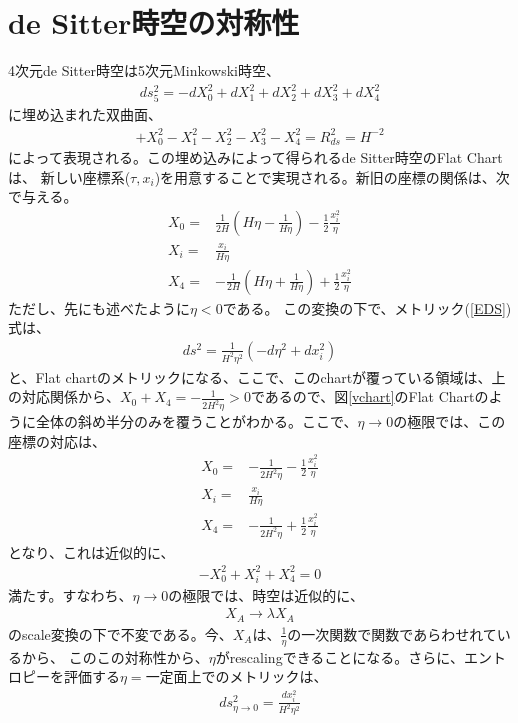 \section{de Sitter時空の対称性}
4次元de Sitter時空は5次元Minkowski時空、
\begin{align}
  \label{EDS}
  ds^2_{5}=-dX_0^2+dX^2_{1}+dX^2_{2}+dX^2_{3}+dX^2_{4}
\end{align}
に埋め込まれた双曲面、
\begin{align}
\label{demtr}
  +X_0^2-X_1^2-X_2^2-X_3^2-X_4^2=R_{ds}^2=H^{-2}
\end{align}
によって表現される。この埋め込みによって得られるde Sitter時空のFlat Chartは、
新しい座標系($\tau,x_{i}$)を用意することで実現される。新旧の座標の関係は、次で与える。
\begin{align}
  X_{0}=&\frac{1}{2H}(H\eta-\frac{1}{H\eta})-\frac{1}{2}\frac{x_i^2}{\eta}\\
  X_{i}=&\frac{x_i}{H\eta}\\
  X_{4}=&-\frac{1}{2H}(H\eta+\frac{1}{H\eta})+\frac{1}{2}\frac{x_i^2}{\eta}
\end{align}
ただし、先にも述べたように$\eta<0$である。
この変換の下で、メトリック(\ref{EDS})式は、
\begin{align}
\label{FlatC}
  ds^{2}=\frac{1}{H^2\eta^2}(-d\eta^2+dx_{i}^2)
\end{align}
と、Flat chartのメトリックになる、ここで、このchartが覆っている領域は、上の対応関係から、$X_{0}+X_{4}=-\frac{1}{2H^2\eta}>0$であるので、図\ref{vchart}のFlat Chartのように全体の斜め半分のみを覆うことがわかる。ここで、$\eta\to 0$の極限では、この座標の対応は、
\begin{align}
  X_{0}=&-\frac{1}{2H^2\eta}-\frac{1}{2}\frac{x_i^2}{\eta}\\
  X_{i}=&\frac{x_i}{H\eta}\\
  X_{4}=&-\frac{1}{2H^2\eta}+\frac{1}{2}\frac{x_i^2}{\eta}
\end{align}
となり、これは近似的に、
\begin{align}
  -X_{0}^2+X_{i}^2+X_{4}^2=0
\end{align}
満たす。すなわち、$\eta\to0$の極限では、時空は近似的に、
\begin{align}
  X_{A}\to\lambda X_{A}
\end{align}
のscale変換の下で不変である。今、$X_{A}$は、$\frac{1}{\eta}$の一次関数で関数であらわせれているから、
このこの対称性から、$\eta$がrescalingできることになる。さらに、エントロピーを評価する$\eta=$一定面上でのメトリックは、
\begin{align}
  ds^2_{\eta\to0}=\frac{dx^2_{i}}{H^2\eta^2}
\end{align}
